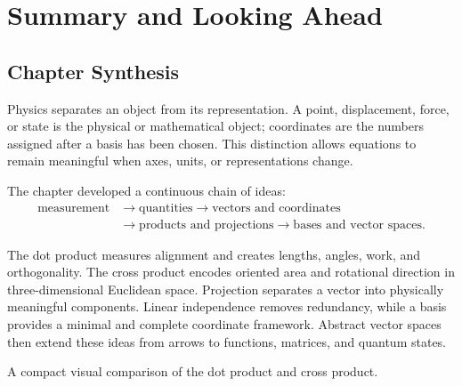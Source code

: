 \section{Summary and Looking Ahead}
\label{sec:vectors-summary}

\subsection{Chapter Synthesis}
Physics separates an object from its representation. A point, displacement, force, or state is the physical or mathematical object; coordinates are the numbers assigned after a basis has been chosen. This distinction allows equations to remain meaningful when axes, units, or representations change.

The chapter developed a continuous chain of ideas:
\[
\begin{aligned}
\text{measurement}&\longrightarrow\text{quantities}
\longrightarrow\text{vectors and coordinates}\\
&\longrightarrow\text{products and projections}
\longrightarrow\text{bases and vector spaces}.
\end{aligned}
\]

The dot product measures alignment and creates lengths, angles, work, and orthogonality. The cross product encodes oriented area and rotational direction in three-dimensional Euclidean space. Projection separates a vector into physically meaningful components. Linear independence removes redundancy, while a basis provides a minimal and complete coordinate framework. Abstract vector spaces then extend these ideas from arrows to functions, matrices, and quantum states.

\begin{bookfigure}{A compact visual comparison of the dot product and cross product.}
\end{bookfigure}

